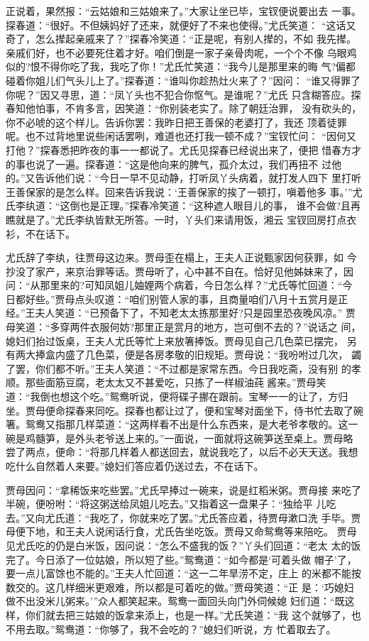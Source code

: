 正说着，果然报：“云姑娘和三姑娘来了。”大家让坐已毕，宝钗便说要出去
一事。探春道：“很好。不但姨妈好了还来，就便好了不来也使得。”尤氏笑道：
“这话又奇了，怎么撵起亲戚来了？”探春冷笑道：“正是呢，有别人撵的，不如
我先撵。亲戚们好，也不必要死住着才好。咱们倒是一家子亲骨肉呢，一个个不像
乌眼鸡似的?恨不得你吃了我，我吃了你！”尤氏忙笑道：“我今儿是那里来的晦
气?偏都碰着你姐儿们气头儿上了。”探春道：“谁叫你趁热灶火来了？”因问：
“谁又得罪了你呢？”因又寻思，道：“凤丫头也不犯合你怄气。是谁呢？”尤氏
只含糊答应。探春知他怕事，不肯多言，因笑道：“你别装老实了。除了朝廷治罪，
没有砍头的，你不必唬的这个样儿。告诉你罢：我昨日把王善保的老婆打了，我还
顶着徒罪呢。也不过背地里说些闲话罢咧，难道也还打我一顿不成？”宝钗忙问：
“因何又打他？”探春悉把昨夜的事一一都说了。尤氏见探春已经说出来了，便把
惜春方才的事也说了一遍。探春道：“这是他向来的脾气，孤介太过，我们再扭不
过他的。”又告诉他们说：“今日一早不见动静，打听凤丫头病着，就打发人四下
里打听王善保家的是怎么样。回来告诉我说：‘王善保家的挨了一顿打，嗔着他多
事。’”尤氏李纨道：“这倒也是正理。”探春冷笑道：“这种遮人眼目儿的事，
谁不会做?且再瞧就是了。”尤氏李纨皆默无所答。一时，丫头们来请用饭，湘云
宝钗回房打点衣衫，不在话下。

尤氏辞了李纨，往贾母这边来。贾母歪在榻上，王夫人正说甄家因何获罪，如
今抄没了家产，来京治罪等话。贾母听了，心中甚不自在。恰好见他姊妹来了，因
问：“从那里来的?可知凤姐儿妯娌两个病着，今日怎么样？”尤氏等忙回道：“今
日都好些。”贾母点头叹道：“咱们别管人家的事，且商量咱们八月十五赏月是正
经。”王夫人笑道：“已预备下了，不知老太太拣那里好?只是园里恐夜晚风凉。”
贾母笑道：“多穿两件衣服何妨?那里正是赏月的地方，岂可倒不去的？”说话之
间，媳妇们抬过饭桌，王夫人尤氏等忙上来放箸捧饭。贾母见自己几色菜已摆完，
另有两大捧盒内盛了几色菜，便是各房孝敬的旧规矩。贾母说：“我吩咐过几次，
蠲了罢，你们都不听。”王夫人笑道：“不过都是家常东西。今日我吃斋，没有别
的孝顺。那些面筋豆腐，老太太又不甚爱吃，只拣了一样椒油莼酱来。”贾母笑
道：“我倒也想这个吃。”鸳鸯听说，便将碟子挪在跟前。宝琴一一的让了，方归
坐。贾母便命探春来同吃。探春也都让过了，便和宝琴对面坐下，侍书忙去取了碗
箸。鸳鸯又指那几样菜道：“这两样看不出是什么东西来，是大老爷孝敬的。这一
碗是鸡髓笋，是外头老爷送上来的。”一面说，一面就将这碗笋送至桌上。贾母略
尝了两点，便命：“将那几样着人都送回去，就说我吃了，以后不必天天送。我想
吃什么自然着人来要。”媳妇们答应着仍送过去，不在话下。

贾母因问：“拿稀饭来吃些罢。”尤氏早捧过一碗来，说是红稻米粥。贾母接
来吃了半碗，便吩咐：“将这粥送给凤姐儿吃去。”又指着这一盘果子：“独给平
儿吃去。”又向尤氏道：“我吃了，你就来吃了罢。”尤氏答应着，待贾母漱口洗
手毕。贾母便下地，和王夫人说闲话行食，尤氏告坐吃饭。贾母又命鸳鸯等来陪吃。
贾母见尤氏吃的仍是白米饭，因问说：“怎么不盛我的饭？”丫头们回道：“老太
太的饭完了。今日添了一位姑娘，所以短了些。”鸳鸯道：“如今都是‘可着头做
帽子’了，要一点儿富馀也不能的。”王夫人忙回道：“这一二年旱涝不定，庄上
的米都不能按数交的。这几样细米更艰难，所以都是可着吃的做。”贾母笑道：“正
是：‘巧媳妇做不出没米儿粥来。’”众人都笑起来。鸳鸯一面回头向门外伺候媳
妇们道：“既这样，你们就去把三姑娘的饭拿来添上，也是一样。”尤氏笑道：“我
这个就够了，也不用去取。”鸳鸯道：“你够了，我不会吃的？”媳妇们听说，方
忙着取去了。

